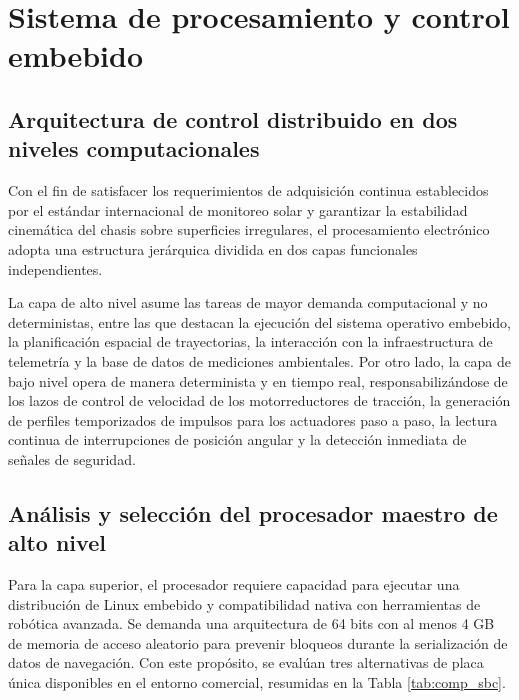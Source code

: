 \documentclass[../../General.tex]{subfiles}
\begin{document}
\section{Sistema de procesamiento y control embebido}

\subsection{Arquitectura de control distribuido en dos niveles computacionales}

Con el fin de satisfacer los requerimientos de adquisición continua establecidos por el estándar internacional de monitoreo solar y garantizar la estabilidad cinemática del chasis sobre superficies irregulares, el procesamiento electrónico adopta una estructura jerárquica dividida en dos capas funcionales independientes.

La capa de alto nivel asume las tareas de mayor demanda computacional y no deterministas, entre las que destacan la ejecución del sistema operativo embebido, la planificación espacial de trayectorias, la interacción con la infraestructura de telemetría y la base de datos de mediciones ambientales. Por otro lado, la capa de bajo nivel opera de manera determinista y en tiempo real, responsabilizándose de los lazos de control de velocidad de los motorreductores de tracción, la generación de perfiles temporizados de impulsos para los actuadores paso a paso, la lectura continua de interrupciones de posición angular y la detección inmediata de señales de seguridad.

\subsection{Análisis y selección del procesador maestro de alto nivel}

Para la capa superior, el procesador requiere capacidad para ejecutar una distribución de Linux embebido y compatibilidad nativa con herramientas de robótica avanzada. Se demanda una arquitectura de 64 bits con al menos 4 GB de memoria de acceso aleatorio para prevenir bloqueos durante la serialización de datos de navegación. Con este propósito, se evalúan tres alternativas de placa única disponibles en el entorno comercial, resumidas en la Tabla \ref{tab:comp_sbc}.
\end{document}
